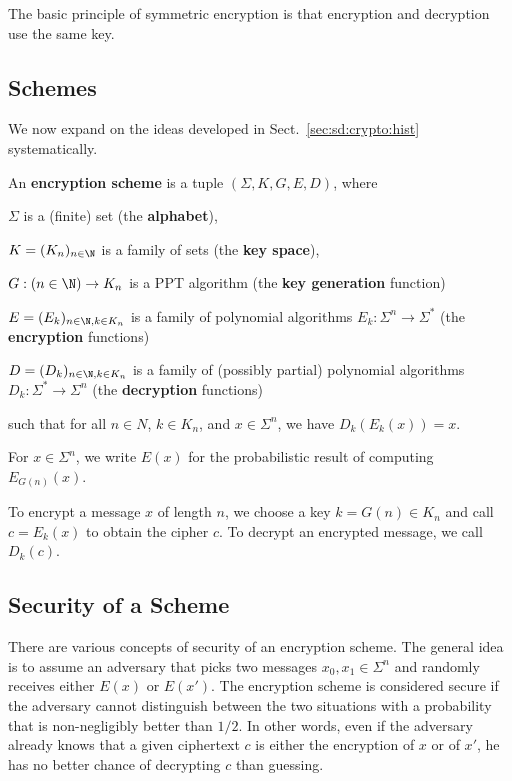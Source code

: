 The basic principle of symmetric encryption is that encryption and decryption use the same key.

\subsection{Schemes}

We now expand on the ideas developed in Sect.~\ref{sec:sd:crypto:hist} systematically.

\begin{definition}
 An \textbf{encryption scheme} is a tuple $(\Sigma,K,G, E, D)$, where
  \begin{compactitem}
   \item $\Sigma$ is a (finite) set (the \textbf{alphabet}),
   \item $K=(K_n)_{n\in \N}$ is a family of sets (the \textbf{key space}),
   \item $G:(n\in \N)\to K_n$ is a PPT algorithm (the \textbf{key generation} function)
   \item $E=(E_k)_{n\in\N,k\in K_n}$ is a family of polynomial algorithms $E_k:\Sigma^n\to\Sigma^*$ (the \textbf{encryption} functions)
   \item $D=(D_k)_{n\in\N,k\in K_n}$ is a family of (possibly partial) polynomial algorithms $D_k:\Sigma^*\to\Sigma^n$ (the \textbf{decryption} functions)
  \end{compactitem}
  such that for all $n\in N$, $k\in K_n$, and $x\in \Sigma^n$, we have $D_k(E_k(x))=x$.

  For $x\in\Sigma^n$, we write $E(x)$ for the probabilistic result of computing $E_{G(n)}(x)$.
\end{definition}

To encrypt a message $x$ of length $n$, we choose a key $k=G(n)\in K_n$ and call $c=E_k(x)$ to obtain the cipher $c$.
To decrypt an encrypted message, we call $D_k(c)$.

\subsection{Security of a Scheme}

There are various concepts of security of an encryption scheme.
The general idea is to assume an adversary that picks two messages $x_0,x_1\in\Sigma^n$ and randomly receives either $E(x)$ or $E(x')$.
The encryption scheme is considered secure if the adversary cannot distinguish between the two situations with a probability that is non-negligibly better than $1/2$.
In other words, even if the adversary already knows that a given ciphertext $c$ is either the encryption of $x$ or of $x'$, he has no better chance of decrypting $c$ than guessing.

